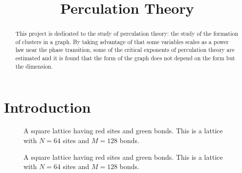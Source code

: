 \documentclass[a4paper,10pt]{article}
\begin{document}
\setlength\parindent{0pt}


\title{Perculation Theory}
\clearpage\maketitle
\thispagestyle{empty}

\begin{abstract}
\noindent This project is dedicated to the study of perculation theory: the study of the formation of clusters in a graph.
By taking advantage of that some variables scales as a power law near the phase transition, some of the critical exponents
of perculation theory are estimated and it is found that the form of the graph does not depend on the form but the dimension.
\end{abstract}

\newpage
\clearpage
\setcounter{page}{1}

\section{Introduction}

\begin{figure}[H]
\end{figure}



\begin{figure}[H]
  \centering
  \def\svgwidth{\linewidth}
  {}
  \caption{A square lattice having red sites and green bonds. This is a lattice with $N = 64$ sites and $M = 128$ bonds.}
\end{figure}

\begin{figure}[H]
  \centering
  \def\svgwidth{\linewidth}
  {}
  \caption{A square lattice having red sites and green bonds. This is a lattice with $N = 64$ sites and $M = 128$ bonds.}
\end{figure}
\end{document}
